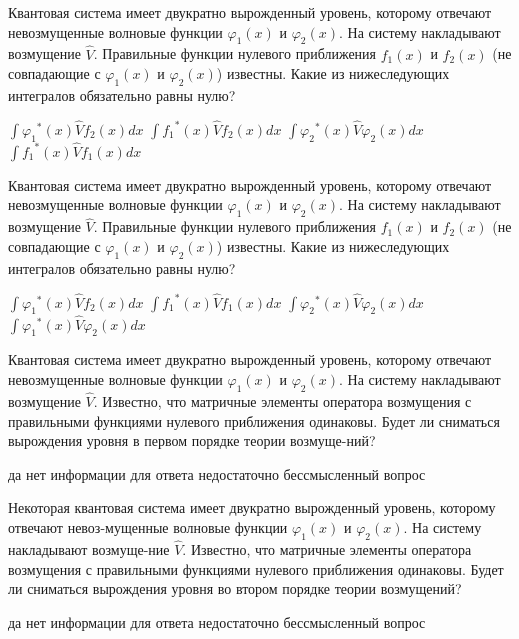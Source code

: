 \documentclass[11pt,a4paper]{exam}
\begin{document}
\begin{questions}
\question Квантовая система имеет двукратно вырожденный уровень, которому отвечают невозмущенные волновые функции ${\varphi _1}(x)$ и ${\varphi _2}(x)$. На систему накладывают возмущение $\hat V$. Правильные функции нулевого приближения ${f_1}(x)$ и ${f_2}(x)$ (не совпадающие с ${\varphi _1}(x)$ и ${\varphi _2}(x)$) известны. Какие из нижеследующих интегралов обязательно равны нулю?
\begin{choices}
\choice $\int {{\varphi _1}^*(x)\hat V} {f_2}(x)dx$  
\choice $\int {{f_1}^*(x)\hat V} {f_2}(x)dx$   
\choice $\int {{\varphi _2}^*(x)\hat V} {\varphi _2}(x)dx$ 
\choice $\int {{f_1}^*(x)\hat V} {f_1}(x)dx$
\end{choices}

\question Квантовая система имеет двукратно вырожденный уровень, которому отвечают невозмущенные волновые функции ${\varphi _1}(x)$ и ${\varphi _2}(x)$. На систему накладывают возмущение $\hat V$. Правильные функции нулевого приближения ${f_1}(x)$ и ${f_2}(x)$ (не совпадающие с ${\varphi _1}(x)$ и ${\varphi _2}(x)$) известны. Какие из нижеследующих интегралов обязательно равны нулю?
\begin{choices}
\choice $\int {{\varphi _1}^*(x)\hat V} {f_2}(x)dx$  
\choice $\int {{f_1}^*(x)\hat V} {f_1}(x)dx$   
\choice $\int {{\varphi _2}^*(x)\hat V} {\varphi _2}(x)dx$ 
\choice $\int {{\varphi _1}^*(x)\hat V} {\varphi _2}(x)dx$
\end{choices}

\question Квантовая система имеет двукратно вырожденный уровень, которому отвечают невозмущенные волновые функции ${\varphi _1}(x)$ и ${\varphi _2}(x)$. На систему накладывают возмущение $\hat V$. Известно, что матричные элементы оператора возмущения с правильными функциями нулевого приближения одинаковы. Будет ли сниматься вырождения уровня в первом порядке теории возмуще-ний?
\begin{choices}
\choice да                   
\choice нет
\choice информации для ответа недостаточно     
\choice бессмысленный вопрос
\end{choices}

\question Некоторая квантовая система имеет двукратно вырожденный уровень, которому отвечают невоз-мущенные волновые функции ${\varphi _1}(x)$ и ${\varphi _2}(x)$. На систему накладывают возмуще-ние $\hat V$. Известно, что матричные элементы оператора возмущения с правильными функциями нулевого приближения одинаковы. Будет ли сниматься вырождения уровня во втором порядке теории возмущений?
\begin{choices}
\choice да                   
\choice нет
\choice информации для ответа недостаточно     
\choice бессмысленный вопрос
\end{choices}


\end{questions}
\end{document}
